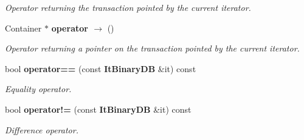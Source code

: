 \begin{CompactItemize}
\begin{CompactList}\small\item\em Operator returning the transaction pointed by the current iterator. \item\end{CompactList}\item 
Container $\ast$ {\bf operator $\rightarrow$ } ()\label{class_it_binary_d_b_1894f39ef8dff3081bfa42605fc128c1}

\begin{CompactList}\small\item\em Operator returning a pointer on the transaction pointed by the current iterator. \item\end{CompactList}\item 
bool {\bf operator==} (const {\bf It\-Binary\-DB} \&it) const \label{class_it_binary_d_b_91eafdf30203a18baf6d392a38f96b0d}

\begin{CompactList}\small\item\em Equality operator. \item\end{CompactList}\item 
bool {\bf operator!=} (const {\bf It\-Binary\-DB} \&it) const \label{class_it_binary_d_b_941afddd8f5ef0c8e0ef9370c2d85035}

\begin{CompactList}\small\item\em Difference operator. \item\end{CompactList}\end{CompactItemize}
